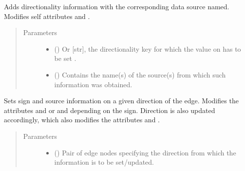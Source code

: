\documentclass[letterpaper,10pt,english]{sphinxmanual}
\begin{document}
\begin{fulllineitems}
\begin{fulllineitems}
\label{\detokenize{main:pypath.main.Direction.set_dir}}
Adds directionality information with the corresponding data
source named. Modifies self attributes  and
.
\begin{quote}\begin{description}
\item[{Parameters}] \leavevmode\begin{itemize}
\item {} 
 () \textendash{} Or {[}str{]}, the directionality key for which the value on
 has to be set .

\item {} 
 () \textendash{} Contains the name(s) of the source(s) from which such
information was obtained.

\end{itemize}

\end{description}\end{quote}

\end{fulllineitems}


\begin{fulllineitems}
\label{\detokenize{main:pypath.main.Direction.set_sign}}
Sets sign and source information on a given direction of the
edge. Modifies the attributes  and
 or  and
 depending on the sign. Direction is
also updated accordingly, which also modifies the attributes
 and .
\begin{quote}\begin{description}
\item[{Parameters}] \leavevmode\begin{itemize}
\item {} 
 () \textendash{} Pair of edge nodes specifying the direction from which the
information is to be set/updated.


\end{itemize}
\end{description}
\end{quote}
\end{fulllineitems}
\end{fulllineitems}
\end{document}
